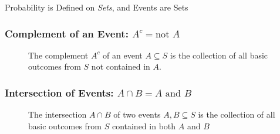 \begin{frame}
\begin{center}
	\Huge Probability is Defined on \emph{Sets}, and Events are Sets
\end{center}
\end{frame}
\def\eventA{(-0.35,0) circle (1.2)}
\def\eventB{(1.35,0) circle (1.2)}
\def\samplespace{(-2,-2) rectangle (3,2)}
\begin{frame}
\frametitle{Complement of an Event: $A^c = \mbox{not } A$}

\begin{figure}
\centering
{}
\caption{The complement $A^c$ of an event $A\subseteq S$ is the collection of all basic outcomes from $S$ not contained in $A$.}
\end{figure}
\end{frame}
\begin{frame}
\frametitle{Intersection of Events: $A\cap B = A \mbox{ and } B$}
\begin{figure}
\centering
{}
\caption{The intersection $A\cap B$ of two events $A,B\subseteq S$ is the collection of all basic outcomes from $S$ contained in both $A$ and $B$}
\end{figure}
\end{frame}
